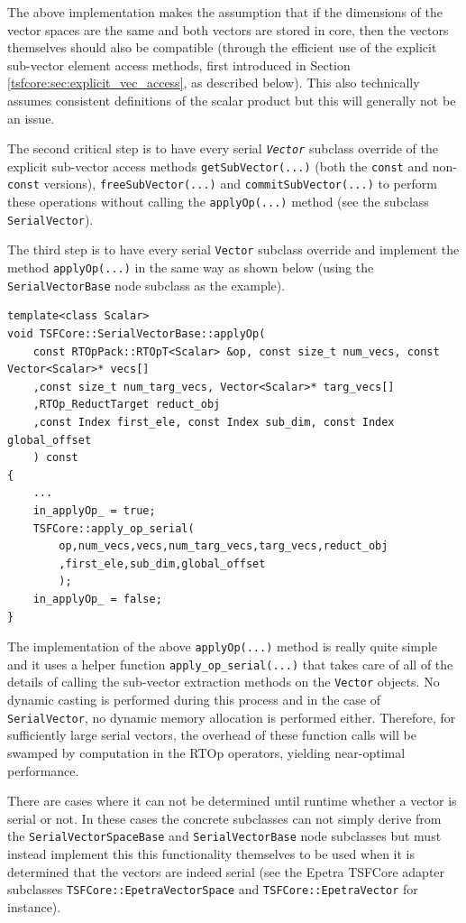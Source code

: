 \noindent The above implementation makes the assumption that if the dimensions
of the vector spaces are the same and both vectors are stored in core,
then the vectors themselves should also be compatible (through the
efficient use of the explicit sub-vector element access methods,
first introduced in Section \ref{tsfcore:sec:explicit_vec_access}, as
described below).  This also technically assumes consistent
definitions of the scalar product but this will generally not be an
issue.

The second critical step is to have every serial
\texttt{\textit{Vector}} subclass override of the explicit sub-vector
access methods \texttt{getSubVector(...)} (both the \texttt{const} and
non-\texttt{const} versions), \texttt{free\-Sub\-Vector(...)} and
\texttt{commit\-Sub\-Vector(...)} to perform these operations without
calling the \texttt{applyOp(\-...)} method (see the subclass
\texttt{SerialVector}).

The third step is to have every serial \texttt{Vector} subclass
override and implement the method \texttt{applyOp(\-...)} in the
same way as shown below (using the \texttt{SerialVectorBase} node
subclass as the example).

{\scriptsize\begin{verbatim}
template<class Scalar>
void TSFCore::SerialVectorBase::applyOp(
    const RTOpPack::RTOpT<Scalar> &op, const size_t num_vecs, const Vector<Scalar>* vecs[]
    ,const size_t num_targ_vecs, Vector<Scalar>* targ_vecs[]
    ,RTOp_ReductTarget reduct_obj
    ,const Index first_ele, const Index sub_dim, const Index global_offset
    ) const
{
    ...
    in_applyOp_ = true;
    TSFCore::apply_op_serial(
        op,num_vecs,vecs,num_targ_vecs,targ_vecs,reduct_obj
        ,first_ele,sub_dim,global_offset
        );
    in_applyOp_ = false;
}
\end{verbatim}}

\noindent The implementation of the above \texttt{applyOp(\-...)} method is really
quite simple and it uses a helper function
\texttt{apply\_op\_serial(...)}  that takes care of all of the details
of calling the sub-vector extraction methods on the \texttt{Vector}
objects.  No dynamic casting is performed during this process and in
the case of \texttt{SerialVector}, no dynamic memory allocation is
performed either.  Therefore, for sufficiently large serial vectors,
the overhead of these function calls will be swamped by computation in
the RTOp operators, yielding near-optimal performance.

There are cases where it can not be determined until runtime whether a
vector is serial or not.  In these cases the concrete subclasses can
not simply derive from the \texttt{Serial\-VectorSpace\-Base} and
\texttt{SerialVectorBase} node subclasses but must instead implement
this this functionality themselves to be used when it is determined
that the vectors are indeed serial (see the Epetra TSFCore adapter
subclasses \texttt{TSFCore::EpetraVectorSpace} and
\texttt{TSFCore::EpetraVector} for instance).

